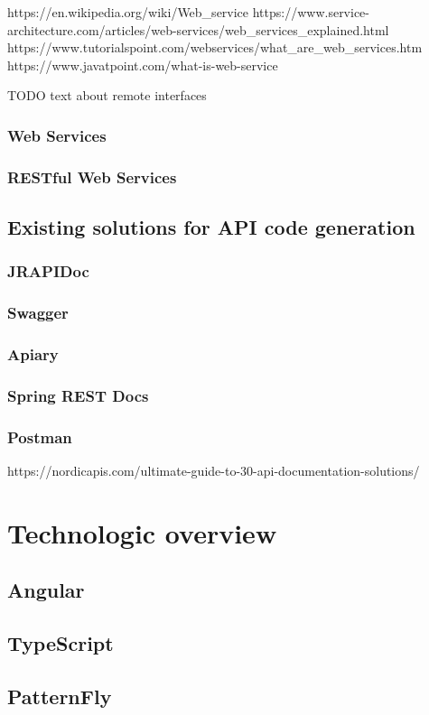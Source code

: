  https://en.wikipedia.org/wiki/Web_service
https://www.service-architecture.com/articles/web-services/web_services_explained.html
https://www.tutorialspoint.com/webservices/what_are_web_services.htm
https://www.javatpoint.com/what-is-web-service


TODO text about remote interfaces
\subsection{ Web Services}
\subsection{RESTful Web Services}

\section{Existing solutions for API code generation}
\subsection{JRAPIDoc}
\subsection{Swagger}
\subsection{Apiary}
\subsection{Spring REST Docs}
\subsection{Postman}
https://nordicapis.com/ultimate-guide-to-30-api-documentation-solutions/

\chapter{Technologic overview}
\label{technology}
\section{Angular}
\section{TypeScript}
\section{PatternFly}


